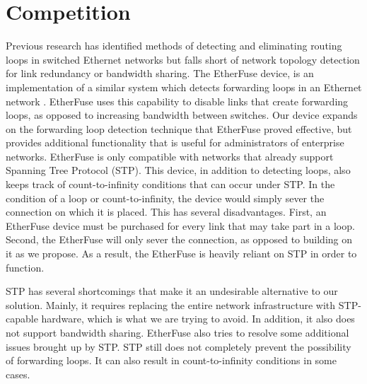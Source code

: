 \documentclass{article}
\begin{document}
\section{Competition}
	Previous research has identified methods of detecting and eliminating routing loops in switched Ethernet networks but falls short of network topology detection for link redundancy or bandwidth sharing.
	The EtherFuse device, is an implementation of a similar system which detects forwarding loops in an Ethernet network \cite{etherfuse}.
	EtherFuse uses this capability to disable links that create forwarding loops, as opposed to increasing bandwidth between switches.
	Our device expands on the forwarding loop detection technique that EtherFuse proved effective, but provides additional functionality that is useful for administrators of enterprise networks.
	EtherFuse is only compatible with networks that already support Spanning Tree Protocol (STP).
	This device, in addition to detecting loops, also keeps track of count-to-infinity conditions that can occur under STP.
	In the condition of a loop or count-to-infinity, the device would simply sever the connection on which it is placed.
	This has several disadvantages.
	First, an EtherFuse device must be purchased for every link that may take part in a loop.
	Second, the EtherFuse will only sever the connection, as opposed to building on it as we propose.
	As a result, the EtherFuse is heavily reliant on STP in order to function.
	
	STP has several shortcomings that make it an undesirable alternative to our solution.
	Mainly, it requires replacing the entire network infrastructure with STP-capable hardware, which is what we are trying to avoid.
	In addition, it also does not support bandwidth sharing.
	EtherFuse also tries to resolve some additional issues brought up by STP\cite{etherfuse}.
	STP still does not completely prevent the possibility of forwarding loops.
	It can also result in count-to-infinity conditions in some cases.
	
\end{document}
